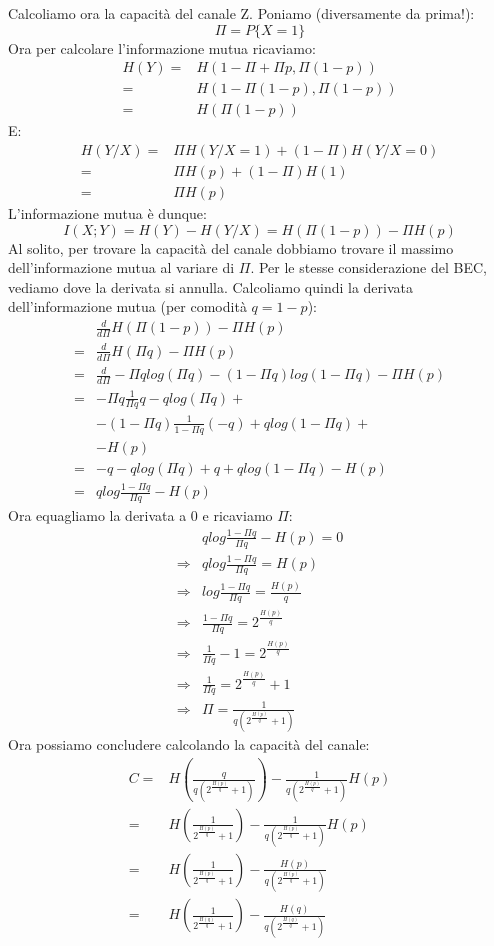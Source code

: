 \noindent
Calcoliamo ora la capacità del canale Z.
Poniamo (diversamente da prima!):
\[
 \Pi=P\{X=1\}
\]
Ora per calcolare l'informazione mutua ricaviamo:
\[\begin{split}
 H(Y)=&H(1-\Pi+\Pi p,\Pi (1-p)) \\
     =&H(1-\Pi(1-p),\Pi(1-p)) \\
     =&H(\Pi(1-p))
  \end{split}
\]
E:
\[\begin{split}
 H(Y/X)=&\Pi H(Y/X=1)+(1-\Pi)H(Y/X=0) \\
     =&\Pi H(p) + (1-\Pi)H(1) \\
     =&\Pi H(p) 
  \end{split}
\]
L'informazione mutua è dunque:
\[
 I(X;Y)=H(Y)-H(Y/X)=H(\Pi(1-p))-\Pi H(p)
\]
Al solito, per trovare la capacità del canale dobbiamo trovare il massimo 
dell'informazione mutua al variare di $\Pi$.
Per le stesse considerazione del BEC, vediamo dove la derivata si annulla.
Calcoliamo quindi la derivata dell'informazione mutua (per comodità $q=1-p$):
\[\begin{split}
 &\frac{d}{d \Pi}  H(\Pi(1-p))-\Pi H(p) \\
 =&\frac{d}{d \Pi}  H(\Pi q)-\Pi H(p) \\
 =&\frac{d}{d \Pi} -\Pi q log(\Pi q) - (1-\Pi q) log(1-\Pi q) -\Pi H(p) \\
 =& -\Pi q \frac{1}{\Pi q} q - qlog(\Pi q)  + \\
  &  -(1-\Pi q) \frac{1}{1-\Pi q} (-q) + q log(1- \Pi q)   +  \\
  &  -H(p) \\
 =& -q -qlog(\Pi q)+ q + qlog(1-\Pi q) -H(p) \\
 =& qlog \frac{1-\Pi q}{\Pi q} -H(p)
 \end{split}
\]
Ora equagliamo la derivata a 0 e ricaviamo $\Pi$:
\[\begin{split}
 & qlog \frac{1-\Pi q}{\Pi q} - H(p)=0 \\
 \Rightarrow & qlog \frac{1-\Pi q}{\Pi q}=H(p) \\
 \Rightarrow & log \frac{1-\Pi q}{\Pi q}=\frac{H(p)}{q} \\
 \Rightarrow & \frac{1-\Pi q}{\Pi q}=2^{\frac{H(p)}{q}} \\
 \Rightarrow & \frac{1}{\Pi q}-1=2^{\frac{H(p)}{q}} \\
 \Rightarrow & \frac{1}{\Pi q}=2^{\frac{H(p)}{q}}+1 \\
 \Rightarrow & \Pi=\frac{1}{q(2^{\frac{H(p)}{q}}+1)}
\end{split}
\]
Ora possiamo concludere calcolando la capacità del canale:
\[\begin{split}
 C=& H \left ( \frac{q}{q(2^{\frac{H(p)}{q}}+1)} \right)-\frac{1}{q(2^{\frac{H(p)}{q}}+1)} H(p) \\
  =& H \left (\frac{1}{2^{\frac{H(p)}{q}}+1} \right)-\frac{1}{q(2^{\frac{H(p)}{q}}+1)} H(p) \\
  =& H \left (\frac{1}{2^{\frac{H(p)}{q}}+1} \right)-\frac{H(p)}{q(2^{\frac{H(p)}{q}}+1)} \\
  =& H \left (\frac{1}{2^{\frac{H(q)}{q}}+1} \right)-\frac{H(q)}{q(2^{\frac{H(q)}{q}}+1)} \\
 \end{split}
\]


